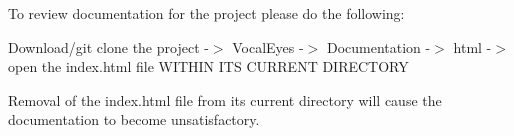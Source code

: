 To review documentation for the project please do the following\+:

Download/git clone the project -\/$>$ Vocal\+Eyes -\/$>$ Documentation -\/$>$ html -\/$>$ open the index.\+html file WITHIN ITS CURRENT DIRECTORY

Removal of the index.\+html file from its current directory will cause the documentation to become unsatisfactory. 